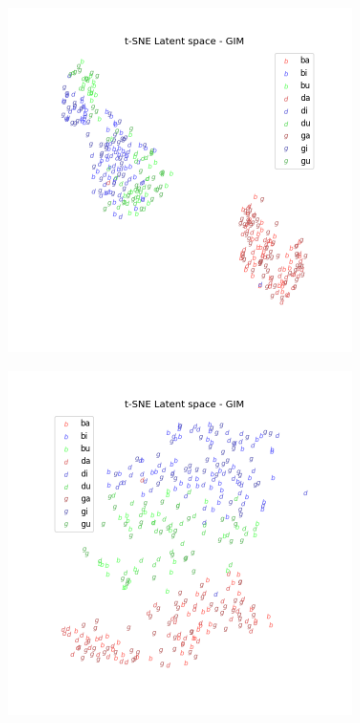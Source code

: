 			
			\begin{figure}[ht] %
				\centering
				\begin{subfigure}{0.45\linewidth}
					\centering
					\includegraphics[width=\linewidth]{"t-sne kld=0.0033 module 1"}
					\caption{}
					\label{fig:t-sne-kld33-module1}
				\end{subfigure}
				\hspace{0cm}
				\begin{subfigure}{0.45\linewidth}
					\centering
					\includegraphics[width=\linewidth]{"t-sne kld=0.0033 module 2"}

\end{subfigure}
\end{figure}
